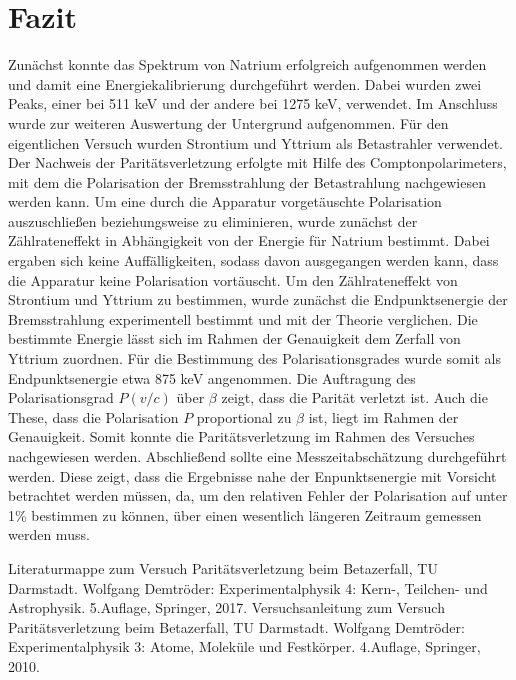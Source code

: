 \documentclass[twoside,colorback,accentcolor=tud4c,11pt]{tudreport}
\begin{document}
\chapter{Fazit}
Zunächst konnte das Spektrum von Natrium erfolgreich aufgenommen werden und damit eine Energiekalibrierung durchgeführt werden. Dabei wurden zwei Peaks, einer bei 511 keV und der andere bei 1275 keV, verwendet. Im Anschluss wurde zur weiteren Auswertung der Untergrund aufgenommen. Für den eigentlichen Versuch wurden Strontium und Yttrium als Betastrahler verwendet. Der Nachweis der Paritätsverletzung erfolgte mit Hilfe des Comptonpolarimeters, mit dem die Polarisation der Bremsstrahlung der Betastrahlung nachgewiesen werden kann. Um eine durch die Apparatur vorgetäuschte Polarisation auszuschließen beziehungsweise zu eliminieren, wurde zunächst der Zählrateneffekt in Abhängigkeit von der Energie für Natrium bestimmt. Dabei ergaben sich keine Auffälligkeiten, sodass davon ausgegangen werden kann, dass die Apparatur keine Polarisation vortäuscht. Um den Zählrateneffekt von Strontium und Yttrium zu bestimmen, wurde zunächst die Endpunktsenergie der Bremsstrahlung experimentell bestimmt und mit der Theorie verglichen. Die bestimmte Energie lässt sich im Rahmen der Genauigkeit dem Zerfall von Yttrium zuordnen. Für die Bestimmung des Polarisationsgrades wurde somit als Endpunktsenergie etwa 875 keV angenommen. Die Auftragung des Polarisationsgrad $P(v/c)$ über $\beta$ zeigt, dass die Parität verletzt ist. Auch die These, dass die Polarisation $P$ proportional zu $\beta$ ist, liegt im Rahmen der Genauigkeit. Somit konnte die Paritätsverletzung im Rahmen des Versuches nachgewiesen werden. Abschließend sollte eine Messzeitabschätzung durchgeführt werden. Diese zeigt, dass die Ergebnisse nahe der Enpunktsenergie mit Vorsicht betrachtet werden müssen, da, um den relativen Fehler der Polarisation auf unter 1\% bestimmen zu können, über einen wesentlich längeren Zeitraum gemessen werden muss.



		

\renewcommand{\bibname}{Literaturverzeichnis}
\begin{thebibliography}{Bak89}
 Literaturmappe zum Versuch Paritätsverletzung beim Betazerfall, TU Darmstadt.
 Wolfgang Demtröder: Experimentalphysik 4: Kern-, Teilchen- und Astrophysik. 5.Auflage, Springer, 2017.
 Versuchsanleitung zum Versuch Paritätsverletzung beim Betazerfall, TU Darmstadt.
 Wolfgang Demtröder: Experimentalphysik 3: Atome, Moleküle und Festkörper. 4.Auflage, Springer, 2010.




\end{thebibliography} 	
\end{document}
